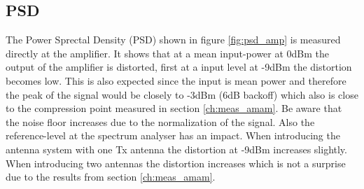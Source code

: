 \subsection{PSD}
The Power Sprectal Density (PSD) shown in figure \ref{fig:psd_amp} is measured directly at the amplifier. It shows that at a mean input-power at 0dBm the output of the amplifier is distorted, first at a input level at -9dBm the distortion becomes low. This is also expected since the input is mean power and therefore the peak of the signal would be closely to -3dBm (6dB backoff) which also is close to the compression point measured in section \ref{ch:meas_amam}. Be aware that the noise floor increases due to the normalization of the signal. Also the reference-level at the spectrum analyser has an impact. When introducing the antenna system with one Tx antenna the distortion at -9dBm increases slightly. When introducing two antennas the distortion increases which is not a surprise due to the results from section \ref{ch:meas_amam}.  


